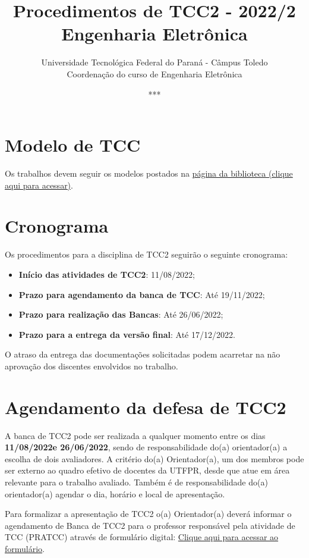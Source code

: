 \documentclass[a4paper, 12pt]{article}
\title{Procedimentos de TCC2 - 2022/2\\\textbf{Engenharia Eletrônica}}
\date{***}
\author{Universidade Tecnológica Federal do Paraná - Câmpus Toledo\\Coordenação do curso de Engenharia Eletrônica}
\newcommand{\startdate}{11/08/2022}		%
\newcommand{\agendadate}{19/11/2022}	%
\newcommand{\bancadate}{26/06/2022}		%
\newcommand{\finaldate}{17/12/2022}		%
\begin{document}
    \maketitle
    
    \section{Modelo de TCC}
    Os trabalhos devem seguir os modelos postados na \href{http://portal.utfpr.edu.br/biblioteca/trabalhos-academicos}{página da biblioteca (clique aqui para acessar)}.
    
    \section{Cronograma}
    \label{sec:CRO}
    
    Os procedimentos para a disciplina de TCC2 seguirão o seguinte cronograma:
    \begin{itemize}
    	\item \textbf{Início das atividades de TCC2}: \startdate;
    	\item \textbf{Prazo para agendamento da banca de TCC}: Até \agendadate;
    	\item \textbf{Prazo para realização das Bancas}: Até \bancadate;
    	\item \textbf{Prazo para a entrega da versão final}: Até \finaldate.
    \end{itemize}

	O atraso da entrega das documentações solicitadas podem acarretar na não aprovação dos discentes envolvidos no trabalho.    
        
   \section{Agendamento da defesa de TCC2}

    A banca de TCC2 pode ser realizada a qualquer momento entre os dias \textbf{\startdate e \bancadate}, sendo de responsabilidade do(a) orientador(a) a escolha de dois avaliadores. A critério do(a) Orientador(a), um dos membros pode ser externo ao quadro efetivo de docentes da UTFPR, desde que atue em área relevante para o trabalho avaliado. Também é de responsabilidade do(a) orientador(a) agendar o dia, horário e local de apresentação. 
    
    Para formalizar a apresentação de TCC2 o(a) Orientador(a) deverá informar o agendamento de Banca de TCC2 para o professor responsável pela atividade de TCC (PRATCC) através de formulário digital: \href{https://forms.gle/QVNraTXAZ27V1xSK8}{Clique aqui para acessar ao formulário}.
    
\end{document}
